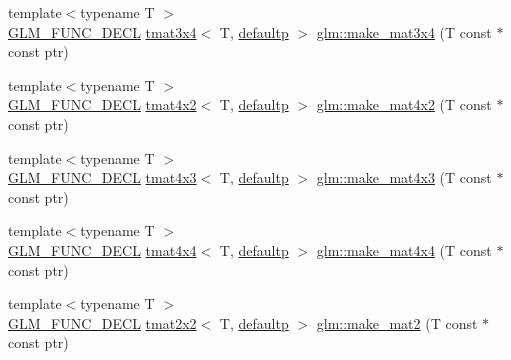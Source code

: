 \begin{DoxyCompactItemize}
\item 
{\footnotesize template$<$typename T $>$ }\\\mbox{\hyperlink{setup_8hpp_ab2d052de21a70539923e9bcbf6e83a51}{G\+L\+M\+\_\+\+F\+U\+N\+C\+\_\+\+D\+E\+CL}} \mbox{\hyperlink{structglm_1_1tmat3x4}{tmat3x4}}$<$ T, \mbox{\hyperlink{namespaceglm_a0f04f086094c747d227af4425893f545a9d21ccd8b5a009ec7eb7677befc3bf51}{defaultp}} $>$ \mbox{\hyperlink{group__gtc__type__ptr_gac083edd180ab4d4b817acc60c516209b}{glm\+::make\+\_\+mat3x4}} (T const $\ast$const ptr)
\item 
{\footnotesize template$<$typename T $>$ }\\\mbox{\hyperlink{setup_8hpp_ab2d052de21a70539923e9bcbf6e83a51}{G\+L\+M\+\_\+\+F\+U\+N\+C\+\_\+\+D\+E\+CL}} \mbox{\hyperlink{structglm_1_1tmat4x2}{tmat4x2}}$<$ T, \mbox{\hyperlink{namespaceglm_a0f04f086094c747d227af4425893f545a9d21ccd8b5a009ec7eb7677befc3bf51}{defaultp}} $>$ \mbox{\hyperlink{group__gtc__type__ptr_ga967a5b934e67ff9a6d1d0d27a377a264}{glm\+::make\+\_\+mat4x2}} (T const $\ast$const ptr)
\item 
{\footnotesize template$<$typename T $>$ }\\\mbox{\hyperlink{setup_8hpp_ab2d052de21a70539923e9bcbf6e83a51}{G\+L\+M\+\_\+\+F\+U\+N\+C\+\_\+\+D\+E\+CL}} \mbox{\hyperlink{structglm_1_1tmat4x3}{tmat4x3}}$<$ T, \mbox{\hyperlink{namespaceglm_a0f04f086094c747d227af4425893f545a9d21ccd8b5a009ec7eb7677befc3bf51}{defaultp}} $>$ \mbox{\hyperlink{group__gtc__type__ptr_ga4d42daced532b33cc672280e48670a51}{glm\+::make\+\_\+mat4x3}} (T const $\ast$const ptr)
\item 
{\footnotesize template$<$typename T $>$ }\\\mbox{\hyperlink{setup_8hpp_ab2d052de21a70539923e9bcbf6e83a51}{G\+L\+M\+\_\+\+F\+U\+N\+C\+\_\+\+D\+E\+CL}} \mbox{\hyperlink{structglm_1_1tmat4x4}{tmat4x4}}$<$ T, \mbox{\hyperlink{namespaceglm_a0f04f086094c747d227af4425893f545a9d21ccd8b5a009ec7eb7677befc3bf51}{defaultp}} $>$ \mbox{\hyperlink{group__gtc__type__ptr_gaf605a5f5e2ff594e8d404b2855b09541}{glm\+::make\+\_\+mat4x4}} (T const $\ast$const ptr)
\item 
{\footnotesize template$<$typename T $>$ }\\\mbox{\hyperlink{setup_8hpp_ab2d052de21a70539923e9bcbf6e83a51}{G\+L\+M\+\_\+\+F\+U\+N\+C\+\_\+\+D\+E\+CL}} \mbox{\hyperlink{structglm_1_1tmat2x2}{tmat2x2}}$<$ T, \mbox{\hyperlink{namespaceglm_a0f04f086094c747d227af4425893f545a9d21ccd8b5a009ec7eb7677befc3bf51}{defaultp}} $>$ \mbox{\hyperlink{group__gtc__type__ptr_ga52a16e333fef7e33ca740779482a8693}{glm\+::make\+\_\+mat2}} (T const $\ast$const ptr)

\end{DoxyCompactItemize}
